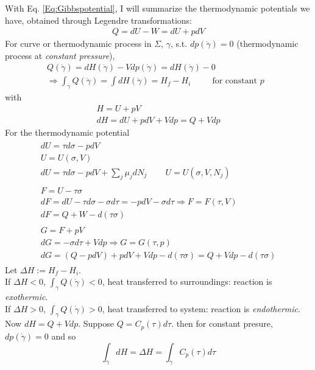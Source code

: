 With Eq. \ref{Eq:Gibbspotential}, I will summarize the thermodynamic potentials we have, obtained through Legendre transformations:
\[
\begin{gathered}
  Q = dU - W = dU + p dV
\end{gathered}
\]
For curve or thermodynamic process in $\Sigma$, $\gamma$, s.t. $dp(\dot{\gamma})=0$ (thermodynamic process at \emph{constant pressure}),
\[
\begin{gathered}
  Q(\dot{\gamma}) = dH(\dot{\gamma}) -Vdp(\dot{\gamma}) = dH(\dot{\gamma}) - 0 \\
  \Longrightarrow \int_{\gamma} Q(\dot{\gamma}) = \int dH(\dot{\gamma}) = H_f - H_i \qquad \, \text{ for constant $p$ }
\end{gathered}
\]
with 
\[
\begin{gathered}
  H = U + pV \\
  dH = dU + pdV + Vdp = Q + Vdp
\end{gathered}
\]
For the thermodynamic potential
\begin{equation}\label{Eq:ThermodynamicPotentialsSummary}
\begin{gathered}
  \begin{gathered}
    dU = \tau d\sigma - pdV \\ 
    \boxed{ U = U(\sigma, V) } \\
    dU = \tau d\sigma - pdV + \sum_j \mu_j dN_j \qquad \, U = U(\sigma, V,N_j)
\end{gathered} \\
  \begin{gathered}
    F = U -\tau \sigma  \\
    dF = dU- \tau d\sigma - \sigma d\tau = -pdV - \sigma d\tau  \Longrightarrow \boxed{ F = F(\tau,V) } \\  
    dF = Q + W - d(\tau \sigma ) 
\end{gathered} \\
  \begin{gathered}
    G = F + pV \\ 
    dG = -\sigma d\tau + Vdp \Longrightarrow \boxed{ G = G(\tau,p) } \\
    dG = (Q - pdV ) + pdV + Vdp - d(\tau \sigma ) = Q + Vdp - d(\tau \sigma)
\end{gathered}
\end{gathered}
\end{equation}
Let $\Delta H := H_f - H_i$.  \\
If $\Delta H < 0$, $\int_{\gamma} Q(\dot{\gamma}) <0$, heat transferred to surroundings: reaction is \emph{exothermic}.  \\
If $\Delta H > 0$, $\int_{\gamma} Q(\dot{\gamma}) >0$, heat transferred to system: reaction is \emph{endothermic}.  
Now $dH = Q + Vdp$.  Suppose $Q = C_p(\tau) d\tau$.  then for constant presure, $dp(\dot{\gamma})=0$ and so 
\[
\int_{\gamma} dH = \Delta H = \int_{\gamma} C_p(\tau) d\tau
\]

